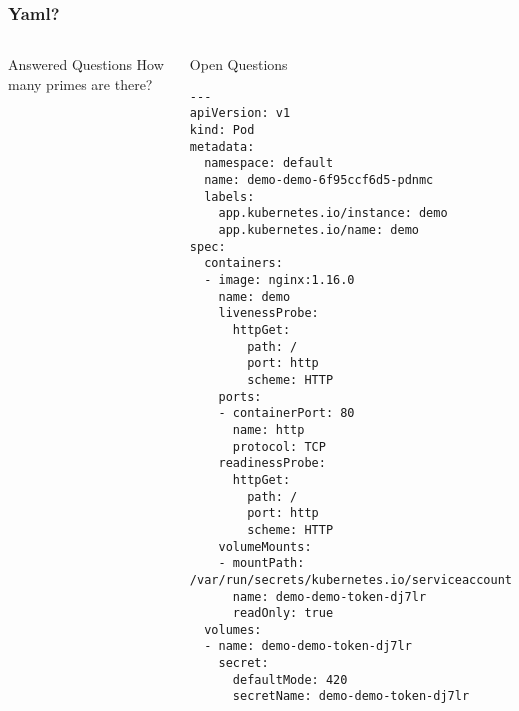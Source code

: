 \documentclass{beamer}
\begin{document}
\begin{frame}[fragile]
\frametitle{Yaml?}
\begin{columns}
    \begin{block}{Answered Questions}
        How many primes are there?
    \end{block}
    \begin{block}{Open Questions}
\begin{verbatim}
---
apiVersion: v1
kind: Pod
metadata:
  namespace: default
  name: demo-demo-6f95ccf6d5-pdnmc
  labels:
    app.kubernetes.io/instance: demo
    app.kubernetes.io/name: demo
spec:
  containers:
  - image: nginx:1.16.0
    name: demo
    livenessProbe:
      httpGet:
        path: /
        port: http
        scheme: HTTP
    ports:
    - containerPort: 80
      name: http
      protocol: TCP
    readinessProbe:
      httpGet:
        path: /
        port: http
        scheme: HTTP
    volumeMounts:
    - mountPath: /var/run/secrets/kubernetes.io/serviceaccount
      name: demo-demo-token-dj7lr
      readOnly: true
  volumes:
  - name: demo-demo-token-dj7lr
    secret:
      defaultMode: 420
      secretName: demo-demo-token-dj7lr

\end{verbatim}
    \end{block}
\end{columns}
\end{frame}
\end{document}
